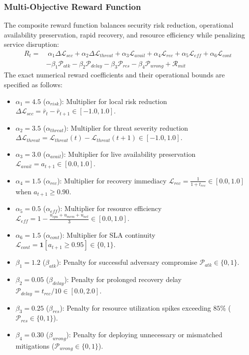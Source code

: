 \documentclass[11pt,a4paper]{article}
\begin{document}
\subsubsection{Multi-Objective Reward Function}
The composite reward function balances security risk reduction, operational availability preservation, rapid recovery, and resource efficiency while penalizing service disruption:
\begin{align}
    R_t = & \; \alpha_1 \Delta \mathcal{L}_{sec} + \alpha_2 \Delta \mathcal{L}_{threat} + \alpha_3 \mathcal{L}_{avail} + \alpha_4 \mathcal{L}_{rec} + \alpha_5 \mathcal{L}_{eff} + \alpha_6 \mathcal{L}_{cont} \nonumber \\
    & - \beta_1 \mathcal{P}_{atk} - \beta_2 \mathcal{P}_{delay} - \beta_3 \mathcal{P}_{res} - \beta_4 \mathcal{P}_{wrong} + \mathcal{R}_{mit}
    \label{eq:reward_function}
\end{align}
The exact numerical reward coefficients and their operational bounds are specified as follows:
\begin{itemize}
    \item $\alpha_1 = 4.5$ ($\alpha_{risk}$): Multiplier for local risk reduction $\Delta \mathcal{L}_{sec} = \bar{r}_t - \bar{r}_{t+1} \in [-1.0, 1.0]$.
    \item $\alpha_2 = 3.5$ ($\alpha_{threat}$): Multiplier for threat severity reduction $\Delta \mathcal{L}_{threat} = \mathcal{L}_{threat}(t) - \mathcal{L}_{threat}(t+1) \in [-1.0, 1.0]$.
    \item $\alpha_3 = 3.0$ ($\alpha_{avail}$): Multiplier for live availability preservation $\mathcal{L}_{avail} = a_{t+1} \in [0.0, 1.0]$.
    \item $\alpha_4 = 1.5$ ($\alpha_{rec}$): Multiplier for recovery immediacy $\mathcal{L}_{rec} = \frac{1}{1 + t_{rec}} \in [0.0, 1.0]$ when $a_{t+1} \ge 0.90$.
    \item $\alpha_5 = 0.5$ ($\alpha_{eff}$): Multiplier for resource efficiency $\mathcal{L}_{eff} = 1 - \frac{u_{cpu} + u_{mem} + u_{net}}{3} \in [0.0, 1.0]$.
    \item $\alpha_6 = 1.5$ ($\alpha_{cont}$): Multiplier for SLA continuity $\mathcal{L}_{cont} = \mathbf{1}[a_{t+1} \ge 0.95] \in \{0, 1\}$.
    \item $\beta_1 = 1.2$ ($\beta_{atk}$): Penalty for successful adversary compromise $\mathcal{P}_{atk} \in \{0, 1\}$.
    \item $\beta_2 = 0.05$ ($\beta_{delay}$): Penalty for prolonged recovery delay $\mathcal{P}_{delay} = t_{rec} / 10 \in [0.0, 2.0]$.
    \item $\beta_3 = 0.25$ ($\beta_{res}$): Penalty for resource utilization spikes exceeding $85\%$ ($\mathcal{P}_{res} \in \{0, 1\}$).
    \item $\beta_4 = 0.30$ ($\beta_{wrong}$): Penalty for deploying unnecessary or mismatched mitigations ($\mathcal{P}_{wrong} \in \{0, 1\}$).
\end{itemize}
\end{document}
